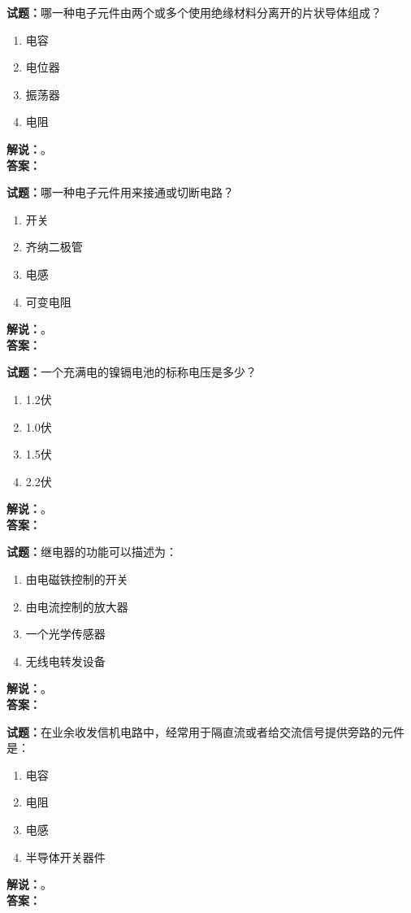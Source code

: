 \documentclass{ctexbook}
\begin{document}
\bigskip

\noindent\textbf{试题：}哪一种电子元件由两个或多个使用绝缘材料分离开的片状导体组成？
\begin{enumerate}[leftmargin=3em]
  \item 电容
  \item 电位器
  \item 振荡器
  \item 电阻
\end{enumerate}
\noindent\textbf{解说：}\textbf{}。\\\noindent\textbf{答案：}

\bigskip

\noindent\textbf{试题：}哪一种电子元件用来接通或切断电路？
\begin{enumerate}[leftmargin=3em]
  \item 开关
  \item 齐纳二极管
  \item 电感
  \item 可变电阻
\end{enumerate}
\noindent\textbf{解说：}\textbf{}。\\\noindent\textbf{答案：}

\bigskip

\noindent\textbf{试题：}一个充满电的镍镉电池的标称电压是多少？
\begin{enumerate}[leftmargin=3em]
  \item 1.2伏
  \item 1.0伏
  \item 1.5伏
  \item 2.2伏
\end{enumerate}
\noindent\textbf{解说：}\textbf{}。\\\noindent\textbf{答案：}

\bigskip

\noindent\textbf{试题：}继电器的功能可以描述为：
\begin{enumerate}[leftmargin=3em]
  \item 由电磁铁控制的开关
  \item 由电流控制的放大器
  \item 一个光学传感器
  \item 无线电转发设备
\end{enumerate}
\noindent\textbf{解说：}\textbf{}。\\\noindent\textbf{答案：}

\bigskip

\noindent\textbf{试题：}在业余收发信机电路中，经常用于隔直流或者给交流信号提供旁路的元件是：
\begin{enumerate}[leftmargin=3em]
  \item 电容
  \item 电阻
  \item 电感
  \item 半导体开关器件
\end{enumerate}
\noindent\textbf{解说：}\textbf{}。\\\noindent\textbf{答案：}
\end{document}
